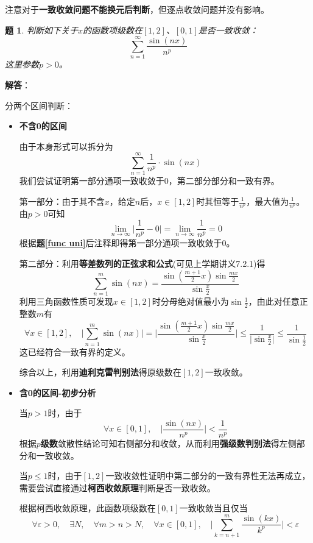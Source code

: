 \documentclass[a4paper,UTF8,fontset=windows,AutoFakeBold]{ctexart}
\newcommand*{\suminf}[1][n=1]{\sum_{#1}^\infty}
\newcommand*{\note}{\noindent *}
\theoremstyle{ex}
\newtheorem{exercise}{题}
\newcommand{\exref}[1]{\textbf{题\;\ref{#1}\;}}
\newcommand{\sol}[1]{{\vspace{5pt}\kaishu\noindent\textbf{解答}：\vspace{-3pt}
\begin{compactitem}
    \item[] #1
\end{compactitem}
}}
\begin{document}
\note 注意对于\textbf{一致收敛问题不能换元后判断}，但逐点收敛问题并没有影响。

\begin{framed}
\begin{exercise}\label{not uni}
    判断如下关于$x$的函数项级数在$[1,2]$、$[0,1]$是否一致收敛：
    $$\suminf\frac{\sin(nx)}{n^p}$$
    这里参数$p>0$。
\end{exercise}
\sol{
    分两个区间判断：
    \begin{itemize}
        \item \textbf{不含0的区间}
        
        由于本身形式可以拆分为
        $$\suminf\frac{1}{n^p}\cdot\sin(nx)$$
        我们尝试证明第一部分通项一致收敛于0，第二部分部分和一致有界。

        第一部分：由于其不含$x$，给定$n$后，$x\in[1,2]$时其恒等于$\frac{1}{n^p}$，最大值为$\frac{1}{n^p}$。由$p>0$可知
        $$\lim_{n\to\infty}\bigg|\frac{1}{n^p}-0\bigg|=\lim_{n\to\infty}\frac{1}{n^p}=0$$
        根据\exref{func uni}后注释即得第一部分通项一致收敛于0。

        第二部分：利用\textbf{等差数列的正弦求和公式}(可见上学期讲义7.2.1)得
        $$\sum_{n=1}^m\sin(nx)=\frac{\sin(\frac{m+1}{2}x)\sin\frac{mx}{2}}{\sin\frac{x}{2}}$$
        利用三角函数性质可发现$x\in[1,2]$时分母绝对值最小为$\sin\frac{1}{2}$，由此对任意正整数$m$有
        $$\forall x\in[1,2],\quad\bigg|\sum_{n=1}^m\sin(nx)\bigg|=\bigg|\frac{\sin(\frac{m+1}{2}x)\sin\frac{mx}{2}}{\sin\frac{x}{2}}\bigg|\le\frac{1}{\big|\sin\frac{x}{2}\big|}\le\frac{1}{\sin\frac{1}{2}}$$
        这已经符合一致有界的定义。

        综合以上，利用\textbf{迪利克雷判别法}得原级数在$[1,2]$一致收敛。
        
        \item \textbf{含0的区间-初步分析}

        当$p>1$时，由于
        $$\forall x\in[0,1],\quad\bigg|\frac{\sin(nx)}{n^p}\bigg|<\frac{1}{n^p}$$
        根据\textbf{$p$级数}敛散性结论可知右侧部分和收敛，从而利用\textbf{强级数判别法}得左侧部分和一致收敛。

        当$p\le1$时，由于$[1,2]$一致收敛性证明中第二部分的一致有界性无法再成立，需要尝试直接通过\textbf{柯西收敛原理}判断是否一致收敛。

        根据柯西收敛原理，此函数项级数在$[0,1]$一致收敛当且仅当
        $$\forall\varepsilon>0,\quad\exists N,\quad\forall m>n>N,\quad\forall x\in[0,1],\quad\bigg|\sum_{k=n+1}^m\frac{\sin(kx)}{k^p}\bigg|<\varepsilon$$


\end{itemize}}
\end{framed}
\end{document}
